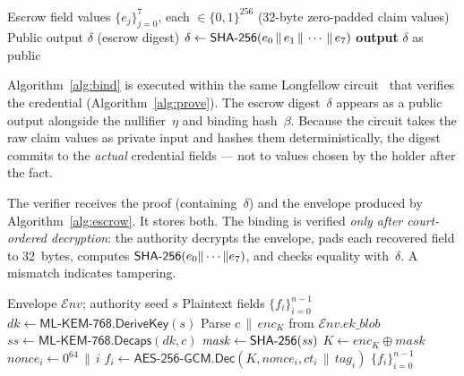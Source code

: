 \begin{algorithm}[t]
  \caption{$\mathsf{Bind}$: In-circuit escrow digest (inside Longfellow hash sub-circuit)}\label{alg:bind}
  \begin{algorithmic}[1]
    \Require Escrow field values $\{e_j\}_{j=0}^{7}$, each $\in \{0,1\}^{256}$ (32-byte zero-padded claim values)
    \Ensure Public output $\delta$ (escrow digest)
    \Statex
    \State $\delta \gets \mathsf{SHA\textnormal{-}256}(e_0 \,\|\, e_1 \,\|\, \cdots \,\|\, e_7)$
    \State \textbf{output} $\delta$ as public
  \end{algorithmic}
\end{algorithm}

Algorithm~\ref{alg:bind} is executed within the same Longfellow circuit~\cite{longfellow} that verifies the credential (Algorithm~\ref{alg:prove}).  The escrow digest~$\delta$ appears as a public output alongside the nullifier~$\eta$ and binding hash~$\beta$.  Because the circuit takes the raw claim values as private input and hashes them deterministically, the digest commits to the \emph{actual} credential fields --- not to values chosen by the holder after the fact.

The verifier receives the proof (containing~$\delta$) and the envelope produced by Algorithm~\ref{alg:escrow}.  It stores both.  The binding is verified \emph{only after court-ordered decryption}: the authority decrypts the envelope, pads each recovered field to 32~bytes, computes $\mathsf{SHA\textnormal{-}256}(e_0 \| \cdots \| e_7)$, and checks equality with~$\delta$.  A mismatch indicates tampering.

\begin{algorithm}[t]
  \caption{$\mathcal{E}.\mathsf{Recover}$: Identity recovery upon court order}\label{alg:recover}
  \begin{algorithmic}[1]
    \Require Envelope $\mathcal{E}\mathit{nv}$; authority seed $s$
    \Ensure Plaintext fields $\{f_i\}_{i=0}^{n-1}$
    \Statex
    \State $\mathit{dk} \gets \textsf{ML-KEM-768}.\mathsf{DeriveKey}(s)$
    \State Parse $c \,\|\, \mathit{enc}_K$ from $\mathcal{E}\mathit{nv}.\mathit{ek\_blob}$
    \State $\mathit{ss} \gets \textsf{ML-KEM-768}.\mathsf{Decaps}(\mathit{dk}, c)$
    \State $\mathit{mask} \gets \mathsf{SHA\textnormal{-}256}(\mathit{ss})$
    \State $K \gets \mathit{enc}_K \oplus \mathit{mask}$
      \State $\mathit{nonce}_i \gets 0^{64} \,\|\, i$
      \State $f_i \gets \textsf{AES-256-GCM}.\mathsf{Dec}(K, \mathit{nonce}_i, \mathit{ct}_i \,\|\, \mathit{tag}_i)$
    \EndFor
    \State \Return $\{f_i\}_{i=0}^{n-1}$
  \end{algorithmic}
\end{algorithm}

